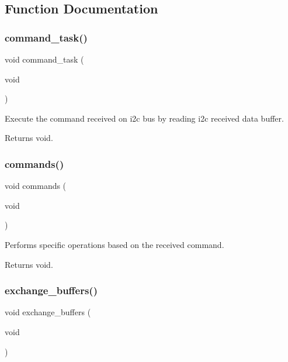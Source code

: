 \subsection{Function Documentation}
\mbox{\label{i2c-rain_8ino_a42389aceb96a84573eb67e6d141cb594}} 
\subsubsection{\texorpdfstring{command\+\_\+task()}{command\_task()}}
{\footnotesize\ttfamily void command\+\_\+task (\begin{DoxyParamCaption}\item[{void}]{ }\end{DoxyParamCaption})}



Execute the command received on i2c bus by reading i2c received data buffer. 

\begin{DoxyReturn}{Returns}
void. 
\end{DoxyReturn}
\mbox{\label{i2c-rain_8ino_a4981066e183f1432ffd6eddf55826585}} 
\subsubsection{\texorpdfstring{commands()}{commands()}}
{\footnotesize\ttfamily void commands (\begin{DoxyParamCaption}\item[{void}]{ }\end{DoxyParamCaption})}



Performs specific operations based on the received command. 

\begin{DoxyReturn}{Returns}
void. 
\end{DoxyReturn}
\mbox{\label{i2c-rain_8ino_a46696a96b3118b5d8900703c054166c8}} 
\subsubsection{\texorpdfstring{exchange\+\_\+buffers()}{exchange\_buffers()}}
{\footnotesize\ttfamily void exchange\+\_\+buffers (\begin{DoxyParamCaption}\item[{void}]{ }\end{DoxyParamCaption})}



